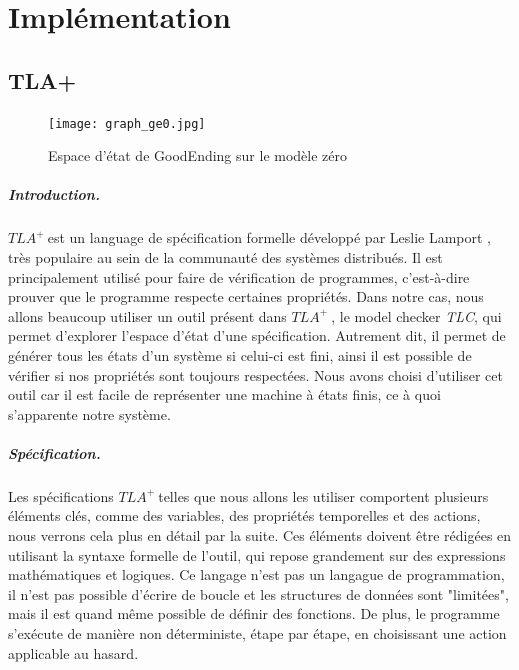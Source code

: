 \documentclass[oneside, a4paper, 11pt]{book}
\newcommand{\TLA}{\ensuremath{TLA^+~}}
\begin{document}
\chapter{Implémentation}
\label{sec:implem}

\section{TLA+}
\label{sec:tla}

\begin{figure}
	\centering
	\texttt{[image: graph\_ge0.jpg]}
	\caption{Espace d'état de GoodEnding sur le modèle zéro}
\end{figure}


\paragraph{Introduction.} \TLA est un language de spécification formelle développé par Leslie Lamport , très populaire au sein de la communauté des systèmes distribués. Il est principalement utilisé pour faire de vérification de programmes, c'est-à-dire prouver que le programme respecte certaines propriétés.
Dans notre cas, nous allons beaucoup utiliser un outil présent dans \TLA, le model checker \textit{TLC}, qui permet d'explorer l'espace d'état d'une spécification. Autrement dit, il permet de générer tous les états d'un système si celui-ci est fini, ainsi il est possible de vérifier si nos propriétés sont toujours respectées.
Nous avons choisi d'utiliser cet outil car il est facile de représenter une machine à états finis, ce à quoi s'apparente notre système.

\paragraph{Spécification.} Les spécifications \TLA telles que nous allons les utiliser comportent plusieurs éléments clés, comme des variables, des propriétés temporelles et des actions, nous verrons cela plus en détail par la suite.
Ces éléments doivent être rédigées en utilisant la syntaxe formelle de l'outil, qui repose grandement sur des expressions mathématiques et logiques. Ce langage n'est pas un langague de programmation, il n'est pas possible d'écrire de boucle et les structures de données sont "limitées", mais il est quand même possible de définir des fonctions. 
De plus, le programme s'exécute de manière non déterministe, étape par étape, en choisissant une action applicable au hasard.
\end{document}
